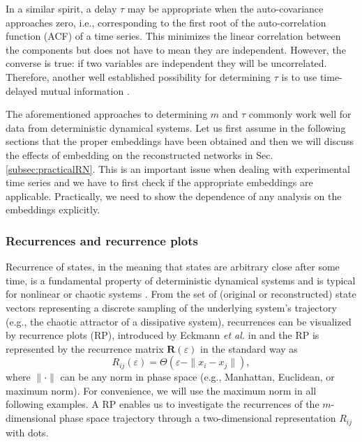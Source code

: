 		In a similar spirit,  a delay $\tau$ may be appropriate when the auto-covariance approaches zero, i.e., corresponding to the first root of the auto-correlation function (ACF) of a time series. This minimizes the linear correlation between the components but does not have to mean they are independent. However, the converse is true: if two variables are independent they will be uncorrelated. Therefore, another well established possibility for determining $\tau$ is to use time-delayed mutual information \cite{Fraser1986}. 
		
		The aforementioned approaches to determining $m$ and $\tau$ commonly work well for data from deterministic dynamical systems. Let us first assume in the following sections that the proper embeddings have been obtained and then we will discuss the effects of embedding on the reconstructed networks in Sec. \ref{subsec:practicalRN}. This is an important issue when dealing with experimental time series and we have to first check if the appropriate embeddings are applicable. Practically, we need to show the dependence of any analysis on the embeddings explicitly. 
		
		
		\subsubsection{Recurrences and recurrence plots}	
		Recurrence of states, in the meaning that states are arbitrary close after some time, is a fundamental property of deterministic dynamical systems and is typical for nonlinear or chaotic systems \cite{Ott1993,poincare1890}. From the set of (original or reconstructed) state vectors representing a discrete sampling of the underlying system's trajectory (e.g., the chaotic attractor of a dissipative system), recurrences can be visualized by recurrence plots (RP), introduced by Eckmann {\textit{et al.}} in \cite{Eckmann1987,marwan2007} and the RP is represented by the recurrence matrix $\textbf{R}(\varepsilon)$ in the standard way as
\begin{equation}
R_{ij}(\varepsilon)=\Theta(\varepsilon-\|x_i-x_j\|),
\end{equation}
\noindent
where $\|\cdot\|$ can be any norm in phase space (e.g., Manhattan, Euclidean, or maximum norm). For convenience, we will use the maximum norm in all following examples. A RP enables us to investigate the recurrences of the $m$-dimensional phase space trajectory through a two-dimensional representation $R_{ij}$ with dots. 

